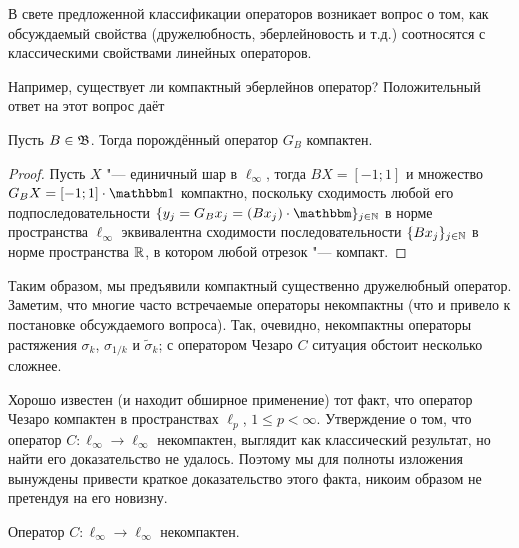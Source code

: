 В свете предложенной классификации операторов возникает вопрос о том,
как обсуждаемый свойства (дружелюбность, эберлейновость и т.д.)
соотносятся с классическими свойствами линейных операторов.

Например, существует ли компактный эберлейнов оператор?
Положительный ответ на этот вопрос даёт

\begin{theorem}
	Пусть $B\in\mathfrak{B}$.
	Тогда порождённый оператор $G_B$ компактен.
\end{theorem}

\begin{proof}
	Пусть $X$ "--- единичный шар в $\ell_\infty$,
	тогда $BX = [-1;1]$
	и множество $G_B X = [-1;1] \cdot \mathbbm 1$
	компактно,
	поскольку сходимость любой его подпоследовательности $\{y_j = G_B x_j = (Bx_j) \cdot \mathbbm\}_{j\in\N}$
	в норме пространства $\ell_\infty$ эквивалентна сходимости последовательности
	$\{Bx_j\}_{j\in\mathbb{N}}$ в норме пространства $\mathbb{R}$,
	в котором любой отрезок "--- компакт.
\end{proof}

Таким образом, мы предъявили компактный существенно дружелюбный оператор.
Заметим, что многие часто встречаемые операторы некомпактны
(что и привело к постановке обсуждаемого вопроса).
Так, очевидно, некомпактны операторы растяжения $\sigma_k$, $\sigma_{1/k}$ и $\tilde\sigma_k$;
с оператором Чезаро $C$ ситуация обстоит несколько сложнее.

Хорошо известен (и находит обширное применение)
тот факт, что оператор Чезаро компактен в пространствах $\ell_p$, $1\leq p < \infty$.
Утверждение о том, что оператор $C:\ell_\infty\to\ell_\infty$ некомпактен,
выглядит как классический результат, но найти его доказательство не удалось.
Поэтому мы для полноты изложения вынуждены привести краткое доказательство этого факта,
никоим образом не претендуя на его новизну.

\begin{lemma}
	Оператор $C:\ell_\infty\to\ell_\infty$ некомпактен.
\end{lemma}

